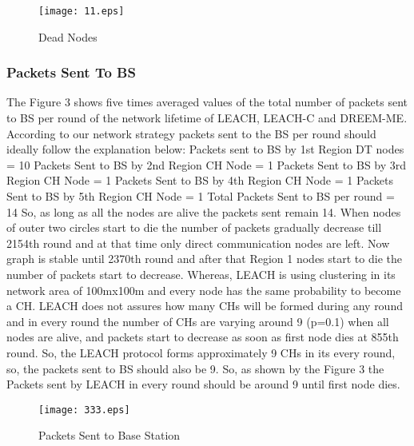 \documentclass[journal]{IEEEtran}
\begin{document}
\begin{figure}[!h]
\centering
\texttt{[image: 11.eps]}
\caption{ Dead Nodes }
\end{figure}

\subsubsection{ Packets Sent To BS }
The Figure 3 shows five times averaged values of the total number of packets sent to BS per round of the network lifetime of LEACH, LEACH-C and DREEM-ME. According to our network strategy packets sent to the BS per round should ideally follow the explanation below:
      Packets sent to BS by 1st Region DT nodes = 10
      Packets Sent to BS by 2nd Region CH Node = 1
      Packets Sent to BS by 3rd Region CH Node = 1
      Packets Sent to BS by 4th Region CH Node = 1
      Packets Sent to BS by 5th Region CH Node = 1
      Total Packets Sent to BS per round = 14
	So, as long as all the nodes are alive the packets sent remain 14. When nodes of outer two circles start to die the number of packets gradually decrease till 2154th round and at that time only direct communication nodes are left. Now graph is stable until 2370th round and after that Region 1 nodes start to die the number of packets start to decrease. Whereas, LEACH is using clustering in its network area of 100mx100m and every node has the same probability to become a CH. LEACH does not assures how many CHs will be formed during any round and in every round the number of CHs are varying around 9 (p=0.1) when all nodes are alive, and packets start to decrease as soon as first node dies at 855th round. So, the LEACH protocol forms approximately 9 CHs in its every round, so, the packets sent to BS should also be 9. So, as shown by the Figure 3 the Packets sent by LEACH in every round should be around 9 until first node dies.

\begin{figure}[!h]
\centering
\texttt{[image: 333.eps]}
\caption{ Packets Sent to Base Station }
\end{figure}
\end{document}

